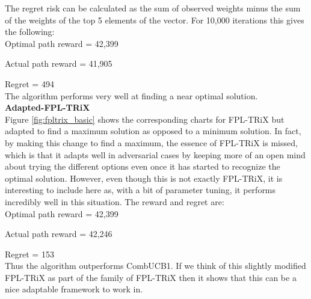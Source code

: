 The regret risk can be calculated as the sum of observed weights minus the sum of the weights of the top 5 elements of the vector. For 10,000 iterations this gives the following:\\

Optimal path reward = 42,399

Actual path reward = 41,905

Regret = 494\\

\noindent The algorithm performs very well at finding a near optimal solution.\\

\noindent \textbf{Adapted-FPL-TRiX}\\

Figure \ref{fig:fpltrix_basic} shows the corresponding charts for FPL-TRiX but adapted to find a maximum solution as opposed to a minimum solution. In fact, by making this change to find a maximum, the essence of FPL-TRiX is missed, which is that it adapts well in adversarial cases by keeping more of an open mind about trying the different options even once it has started to recognize the optimal solution. However, even though this is not exactly FPL-TRiX, it is interesting to include here as, with a bit of parameter tuning, it performs incredibly well in this situation. The reward and regret are:\\

Optimal path reward = 42,399

Actual path reward = 42,246

Regret = 153\\

Thus the algorithm outperforms CombUCB1. If we think of this slightly modified FPL-TRiX as part of the family of FPL-TRiX then it shows that this can be a nice adaptable framework to work in.\\

